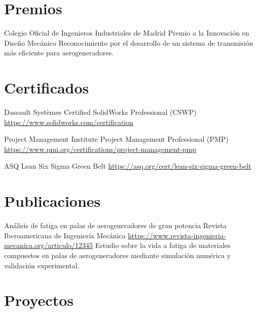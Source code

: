 \documentclass[a4paper, serif, 10pt]{moderncv}
\begin{document}
\section{Premios}

        {Colegio Oficial de Ingenieros Industriales de Madrid}
        {Premio a la Innovación en Diseño Mecánico}
        {}
        {}
        {Reconocimiento por el desarrollo de un sistema de transmisión más eficiente para aerogeneradores.}
\section{Certificados}

        {Dassault Systèmes}
        {Certified SolidWorks Professional (CSWP)}
        {\url{https://www.solidworks.com/certification}}
        {}
        {}

        {Project Management Institute}
        {Project Management Professional (PMP)}
        {\url{https://www.pmi.org/certifications/project-management-pmp}}
        {}
        {}

        {ASQ}
        {Lean Six Sigma Green Belt}
        {\url{https://asq.org/cert/lean-six-sigma-green-belt}}
        {}
        {}
\section{Publicaciones}

        {Análisis de fatiga en palas de aerogeneradores de gran potencia}
        {Revista Iberoamericana de Ingeniería Mecánica}
        {\url{https://www.revista-ingenieria-mecanica.org/articulo/12345}}
        {}
        {Estudio sobre la vida a fatiga de materiales compuestos en palas de aerogeneradores mediante simulación numérica y validación experimental.}
\section{Proyectos}
\end{document}
